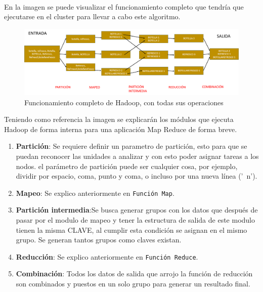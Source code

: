 \\
En la imagen  se puede visualizar el funcionamiento completo que tendría que ejecutarse en el cluster para llevar a cabo este algoritmo.
\begin{figure}[!htbp]
	\hypertarget{fig:redi2}{\hspace{1pt}}
	\begin{center}
		\includegraphics[width=.9\textwidth]{capitulo4/images/im2.png}
		\caption{Funcionamiento completo de Hadoop, con todas sus operaciones}
		\label{fig:redi2}
	\end{center}
\end{figure}
Teniendo como referencia la imagen  se explicarán los módulos que ejecuta Hadoop de forma interna para una aplicación Map Reduce de forma breve.
\begin{enumerate}
	\item \textbf{Partición}: Se requiere definir un parametro de partición, esto para que se puedan reconocer las unidades a analizar y con esto poder asignar tareas a los nodos. el parámetro de partición puede ser cualquier cosa, por ejemplo, dividir por espacio, coma, punto y coma, o incluso por una nueva línea ('\ n').
	\item \textbf{Mapeo}: Se explico anteriormente en  \texttt{Función Map}.
	\item \textbf{Partición intermedia}:Se busca generar grupos con los datos que después de pasar por el modulo de mapeo y tener la estructura de salida de este modulo tienen la misma CLAVE, al cumplir esta condición se asignan en el mismo grupo. Se generan tantos grupos como claves existan.
	\item \textbf{Reducción}: Se explico anteriormente en  \texttt{Función Reduce}. 
	\item \textbf{Combinación}: Todos los datos de salida que arrojo la función de reducción son combinados y puestos en un solo grupo para generar un resultado final.
\end{enumerate}

